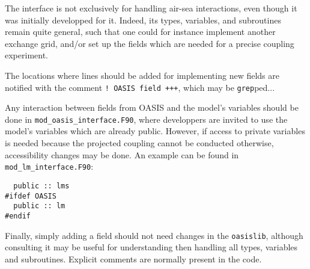The interface is not exclusively for handling air-sea interactions, even though it was
initially developped for it. Indeed, its types, variables, and subroutines remain quite
general, such that one could for instance implement another exchange grid, and/or set up
the fields which are needed for a precise coupling experiment.

The locations where lines should be added for implementing new fields are notified with
the comment \verb=! OASIS field +++=, which may be \verb=grep=ped...

Any interaction between fields from OASIS and the model's variables should be done in
\verb=mod_oasis_interface.F90=, where developpers are invited to use the model's variables
which are already public. However, if access to private variables is needed because
the projected coupling cannot be conducted otherwise, accessibility changes may be done.
An example can be found in \verb=mod_lm_interface.F90=:
\begin{verbatim}
  public :: lms
#ifdef OASIS
  public :: lm
#endif
\end{verbatim}

Finally, simply adding a field should not need changes in the \verb=oasislib=, although
consulting it may be useful for understanding then handling all types, variables and
subroutines. Explicit comments are normally present in the code.
